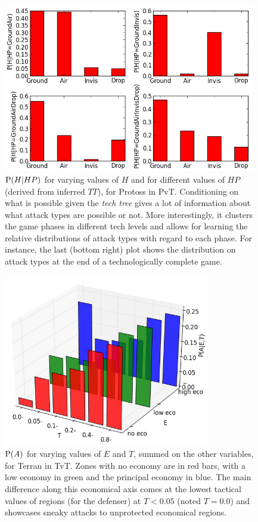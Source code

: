 \begin{figure}[!h]
\centerline{\includegraphics[width=11cm]{images/PossibleP.png}}
\caption{$\mathrm{P}(H|HP)$ for varying values of $H$ and for different values of $HP$ (derived from inferred $TT$), for Protoss in PvT. Conditioning on what is possible given the \textit{tech tree} gives a lot of information about what attack types are possible or not. More interestingly, it clusters the game phases in different tech levels and allows for learning the relative distributions of attack types with regard to each phase. For instance, the last (bottom right) plot shows the distribution on attack types at the end of a technologically complete game.}
\label{fig:PossibleP}
\end{figure}

\begin{figure}[!h]
\centerline{\includegraphics[width=9cm]{images/where3D_EI_TI_RegT.png}}
\caption{$\mathrm{P}(A)$ for varying values of $E$ and $T$, summed on the other variables, for Terran in TvT. Zones with no economy are in red bars, with a low economy in green and the principal economy in blue. The main difference along this economical axis comes at the lowest tactical values of regions (for the defenser) at $T<0.05$ (noted $T=0.0$) and showcases sneaky attacks to unprotected economical regions.}
\label{fig:Where3D}
\end{figure}

